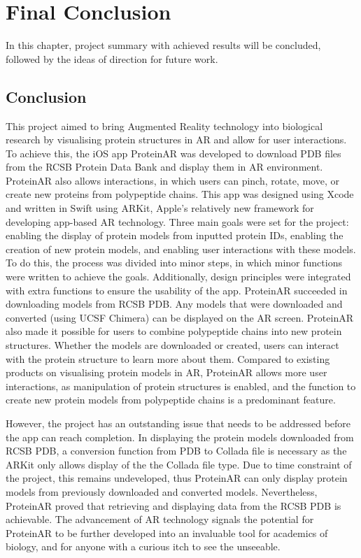 \chapter{Final Conclusion}
\label{ch:conclusion}
In this chapter, project summary with achieved results will be concluded, followed by the ideas of direction for future work.
\section{Conclusion}
This project aimed to bring Augmented Reality technology into biological research by visualising protein structures in AR and allow for user interactions. To achieve this, the iOS app ProteinAR was developed to download PDB files from the RCSB Protein Data Bank and display them in AR environment. ProteinAR also allows interactions, in which users can pinch, rotate, move, or create new proteins from  polypeptide chains. This app was designed using Xcode and written in Swift using ARKit, Apple's relatively new framework for developing app-based AR technology. Three main goals were set for the project: enabling the display of protein models from inputted protein IDs, enabling the creation of new protein models, and enabling user interactions with these models. To do this, the process was divided into minor steps, in which minor functions were written to achieve the goals. Additionally, design principles were integrated with extra functions to ensure the usability of the app. 
ProteinAR succeeded in downloading models from RCSB PDB. Any models that were downloaded and converted (using UCSF Chimera) can be displayed on the AR screen. ProteinAR also made it possible for users to combine polypeptide chains into new protein structures. Whether the models are downloaded or created, users can interact with the protein structure to learn more about them. Compared to existing products on visualising protein models in AR, ProteinAR allows more user interactions, as manipulation of protein structures is enabled, and the function to create new protein models from polypeptide chains is a predominant feature.

However, the project has an outstanding issue that needs to be addressed before the app can reach completion. In displaying the protein models downloaded from RCSB PDB, a conversion function from PDB to Collada file is necessary as the ARKit only allows display of the the Collada file type. Due to time constraint of the project, this remains undeveloped, thus ProteinAR can only display protein models from previously downloaded and converted models. 
Nevertheless, ProteinAR proved that retrieving and displaying data from the RCSB PDB is achievable. The advancement of AR technology signals the potential for ProteinAR to be further developed into an invaluable tool for academics of biology, and for anyone with a curious itch to see the unseeable.

